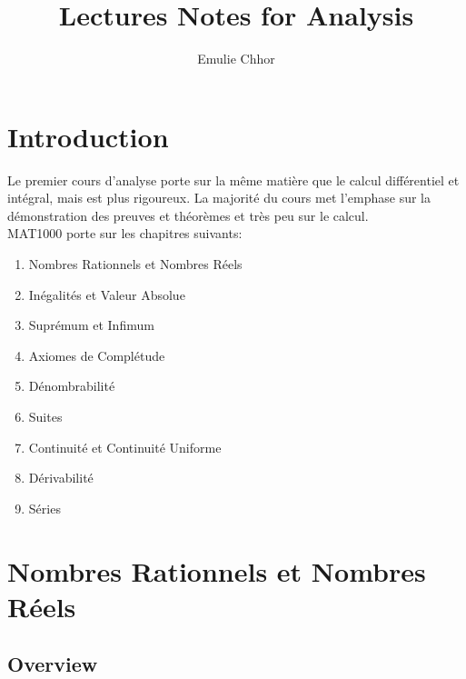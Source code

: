 \documentclass{article}
\begin{document}
\title{Lectures Notes for Analysis}
\author{Emulie Chhor}
\maketitle

\section*{Introduction}

Le premier cours d'analyse porte sur la même matière que le calcul différentiel
et intégral, mais est plus rigoureux. La majorité du cours met l'emphase sur la
démonstration des preuves et théorèmes et très peu sur le calcul.\\

MAT1000 porte sur les chapitres suivants:\\

    \begin{enumerate}
	\item Nombres Rationnels et Nombres Réels
	\item Inégalités et Valeur Absolue
	\item Suprémum et Infimum
	\item Axiomes de Complétude
	\item Dénombrabilité
	\item Suites
	\item Continuité et Continuité Uniforme
	\item Dérivabilité
	\item Séries
    \end{enumerate}

\newtheorem{definition}{Definition}[subsection]
\newtheorem{theorem}{Theorem}[subsection]
\newtheorem{corollary}{Corollary}[subsection]
\newtheorem{lemma}[theorem]{Lemma}
\newtheorem{proposition}{Proposition}[section]
\newtheorem{axiom}{Axiome}
\newtheorem{property}{Propriété}[subsection]
\newtheorem*{remark}{Remarque}
\newtheorem*{problem}{Problème}
\newtheorem*{intuition}{Intuition}

\pagebreak

\section{Nombres Rationnels et Nombres Réels}

\subsection{Overview}
\end{document}
